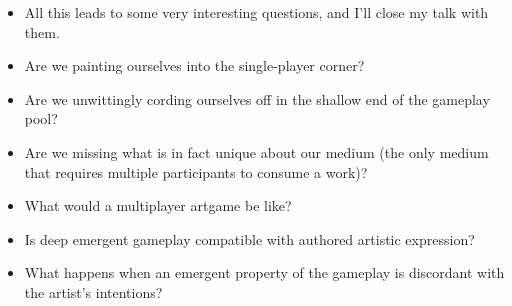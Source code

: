 \documentclass[12pt]{article}
\begin{document}
{\begin{itemize}
\item All this leads to some very interesting questions, and I'll close my talk with them.

\item Are we painting ourselves into the single-player corner?

\item Are we unwittingly cording ourselves off in the shallow end of the gameplay pool?

\item Are we missing what is in fact unique about our medium (the only medium that requires multiple participants to consume a work)?

\item What would a multiplayer artgame be like?

\item Is deep emergent gameplay compatible with authored artistic expression?

\item What happens when an emergent property of the gameplay is discordant with the artist's intentions?
 








\end{itemize}
}
\end{document}
